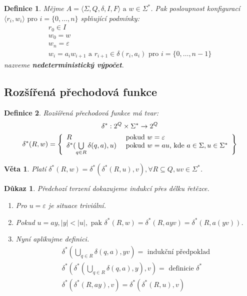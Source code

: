\documentclass[10pt, a4paper, titlepage]{article}
\theoremstyle{note}
\newtheorem{dukaz}{Důkaz}
\newtheorem{veta}{Věta}
\newtheorem{definice}{Definice}
\begin{document}
\begin{definice}
Mějme $A = \langle \Sigma, Q, \delta, I, F \rangle  \text{ a } w \in \Sigma^{*}$. Pak posloupnost konfigurací $\langle r_{i}, w_{i} \rangle \text{ pro } i = \lbrace 0, \ldots, n \rbrace $ splňující podmínky:
\begin{gather}
r_{0} \in I \\
w_{0} = w \\
w_{n} = \varepsilon \\
w_{i} = a_{i}w_{i+1} \text{ a } r_{i+1} \in \delta (r_{i}, a_{i}) \text{ pro } i = \lbrace 0, \ldots,  n-1 \rbrace
\end{gather}
nazveme \textbf{nedeterministický výpočet}.
\end{definice}

\subsection{Rozšířená přechodová funkce}
\begin{definice}
Rozšířená přechodová funkce má tvar:
\begin{gather*}
\delta^{*} : 2^{Q} \times \Sigma^{*} \rightarrow 2^{Q} \\
\delta^{*}(R, w) = \left\lbrace
\begin{array}{l l}
R & \text{ pokud } w = \varepsilon \\
\delta^{*}(\bigcup\limits_{q \in R} \delta(q, a), u) & \text{ pokud } w = au\text{, kde } a \in \Sigma, u \in \Sigma^{*} \\
\end{array}
\right\rbrace
\end{gather*}
\end{definice}

\begin{veta}
Platí $\delta^{*}(R,w) = \delta^{*}(\delta^{*}(R,u),v), \forall R \subseteq Q, uv \in \Sigma^{*}$.
\end{veta}
\begin{dukaz}
Předchozí tvrzení dokazujeme indukcí přes délku řetězce.

\begin{enumerate}
\item
Pro $u = \varepsilon$ je situace triviální.

\item
Pokud $u = ay, |y| < |u|,\text{ pak } \delta^{*}(R,w) = \delta^{*}(R,ayv) = \delta^{*}(R,a(yv))$.

\item
Nyní aplikujme definici.
\begin{gather*}
\delta^{*}(\bigcup\limits_{q \in R} \delta(q, a), yv) = \text{ indukční předpoklad} \\
\delta^{*}(\delta^{*}(\bigcup\limits_{q \in R} \delta(q, a), y), v) = \text{ definicie } \delta^{*} \\
\delta^{*}(\delta^{*}(R, ay), v) = \delta^{*}(\delta^{*}(R,u),v)
\end{gather*}
\end{enumerate}
\end{dukaz}
\end{document}
